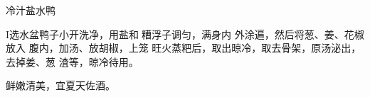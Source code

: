 \begin{recipe}{冷汁盐水鸭}

\ingredients


\preparation

I选水盆鸭子小开洗净，用盐和𫃑糟浮子调匀，满身内 外涂遍，然后将葱、姜、花椒放入
腹内，加汤、放胡椒，上笼 旺火蒸粑后，取出晾冷，取去骨架，原汤泌出，去掉姜、葱
渣等，晾冷待用。

\features

鲜嫩清美，宜夏天佐酒。

\end{recipe}

